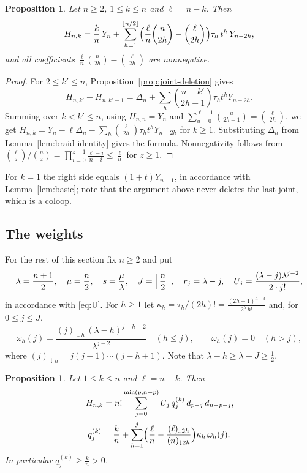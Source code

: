 \documentclass[11pt]{amsart}
\newtheorem{proposition}[theorem]{Proposition}
\theoremstyle{definition}
\theoremstyle{remark}
\numberwithin{equation}{section}
\newcommand{\ff}[2]{(#1)_{\downarrow #2}}
\begin{document}
\begin{proposition}\label{prop:positive-decomp}
Let $n\ge2$, $1\le k\le n$ and $\ell=n-k$. Then
\[
H_{n,k}=\frac kn\,Y_n+\sum_{h=1}^{\lfloor n/2\rfloor}\Bigl(\frac\ell n\binom n{2h}-\binom\ell{2h}\Bigr)\tau_h\,t^h\,Y_{n-2h},
\]
and all coefficients $\frac\ell n\binom n{2h}-\binom\ell{2h}$ are nonnegative.
\end{proposition}

\begin{proof}
For $2\le k'\le n$, Proposition~\ref{prop:joint-deletion} gives
\[
H_{n,k'}-H_{n,k'-1}=\Delta_n+\sum_h\binom{n-k'}{2h-1}\tau_ht^hY_{n-2h}.
\]
Summing over $k<k'\le n$, using $H_{n,n}=Y_n$ and $\sum_{u=0}^{\ell-1}\binom u{2h-1}=\binom\ell{2h}$, we get $H_{n,k}=Y_n-\ell\Delta_n-\sum_h\binom\ell{2h}\tau_ht^hY_{n-2h}$ for $k\ge1$. Substituting $\Delta_n$ from Lemma~\ref{lem:braid-identity} gives the formula. Nonnegativity follows from $\binom\ell z/\binom nz=\prod_{i=0}^{z-1}\frac{\ell-i}{n-i}\le\frac\ell n$ for $z\ge1$.
\end{proof}

For $k=1$ the right side equals $(1+t)Y_{n-1}$, in accordance with Lemma~\ref{lem:basic}; note that the argument above never deletes the last joint, which is a coloop.

\subsection{The weights}
For the rest of this section fix $n\ge2$ and put
\[
\lambda=\frac{n+1}2,\quad\mu=\frac n2,\quad s=\frac\mu\lambda,\quad J=\Bigl\lfloor\frac n2\Bigr\rfloor,\quad r_j=\lambda-j,\quad U_j=\frac{(\lambda-j)\lambda^{j-2}}{2\cdot j!},
\]
in accordance with \eqref{eq:U}. For $h\ge1$ let $\kappa_h=\tau_h/(2h)!=\frac{(2h-1)^{h-3}}{2^h\,h!}$ and, for $0\le j\le J$,
\[
\omega_h(j)=\frac{\ff jh\,(\lambda-h)^{j-h-2}}{\lambda^{j-2}}\quad(h\le j),\qquad\omega_h(j)=0\quad(h>j),
\]
where $\ff jh=j(j-1)\cdots(j-h+1)$. Note that $\lambda-h\ge\lambda-J\ge\frac12$.

\begin{proposition}\label{prop:trivial-weights}
Let $1\le k\le n$ and $\ell=n-k$. Then
\begin{gather*}
[t^p]\,H_{n,k}=n!\sum_{j=0}^{\min(p,n-p)}U_j\,q^{(k)}_j\,d_{p-j}\,d_{n-p-j},\\
q^{(k)}_j=\frac kn+\sum_{h=1}^{j}\Bigl(\frac\ell n-\frac{\ff\ell{2h}}{\ff n{2h}}\Bigr)\kappa_h\,\omega_h(j).
\end{gather*}
In particular $q^{(k)}_j\ge\frac kn>0$.
\end{proposition}
\end{document}
